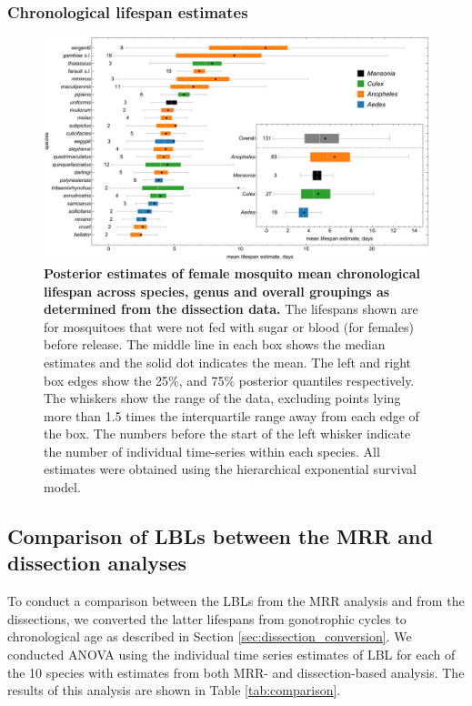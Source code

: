 \documentclass[12pt]{article}
\begin{document}
{\subsubsection{Chronological lifespan estimates}
\begin{figure}[h]
	\centerline{\includegraphics[width=1\textwidth]{./Figure_files/dissection_lifetimes_exponential_chron.pdf}}
	\caption{\textbf{Posterior estimates of female mosquito mean chronological lifespan across species, genus and overall groupings as determined from the dissection data.} The lifespans shown are for mosquitoes that were not fed with sugar or blood (for females) before release. The middle line in each box shows the median estimates and the solid dot indicates the mean. The left and right box edges show the 25\%, and 75\% posterior quantiles respectively. The whiskers show the range of the data, excluding points lying more than 1.5 times the interquartile range away from each edge of the box. The numbers before the start of the left whisker indicate the number of individual time-series within each species. All estimates were obtained using the hierarchical exponential survival model.}
	\label{fig:dissection_lifetimes_exponential}
\end{figure}

\subsection{Comparison of LBLs between the MRR and dissection analyses}
To conduct a comparison between the LBLs from the MRR analysis and from the dissections, we converted the latter lifespans from gonotrophic cycles to chronological age as described in Section \ref{sec:dissection_conversion}. We conducted ANOVA using the individual time series estimates of LBL for each of the 10 species with estimates from both MRR- and dissection-based analysis. The results of this analysis are shown in Table \ref{tab:comparison}.

}
\end{document}
